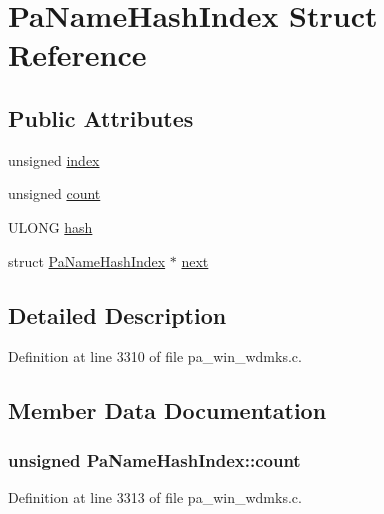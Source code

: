 \hypertarget{struct_pa_name_hash_index}{}\section{Pa\+Name\+Hash\+Index Struct Reference}
\label{struct_pa_name_hash_index}
\subsection*{Public Attributes}
\begin{DoxyCompactItemize}
\item 
unsigned \hyperlink{struct_pa_name_hash_index_a50ce2b35427378c04b50ec6d2fb214bf}{index}
\item 
unsigned \hyperlink{struct_pa_name_hash_index_a6724f5c6a1814cd7ccc024d079222b89}{count}
\item 
U\+L\+O\+NG \hyperlink{struct_pa_name_hash_index_a6895320b6d2e45ee368d72704a3ee334}{hash}
\item 
struct \hyperlink{struct_pa_name_hash_index}{Pa\+Name\+Hash\+Index} $\ast$ \hyperlink{struct_pa_name_hash_index_aff49b9db6ce618e8bc7f43ad863e37fd}{next}
\end{DoxyCompactItemize}


\subsection{Detailed Description}


Definition at line 3310 of file pa\+\_\+win\+\_\+wdmks.\+c.



\subsection{Member Data Documentation}
\subsubsection[{\texorpdfstring{count}{count}}]{\setlength{\rightskip}{0pt plus 5cm}unsigned Pa\+Name\+Hash\+Index\+::count}\hypertarget{struct_pa_name_hash_index_a6724f5c6a1814cd7ccc024d079222b89}{}\label{struct_pa_name_hash_index_a6724f5c6a1814cd7ccc024d079222b89}


Definition at line 3313 of file pa\+\_\+win\+\_\+wdmks.\+c.

